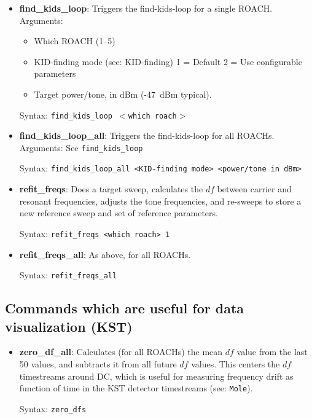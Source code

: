 \begin{itemize}[leftmargin=*,label={}]
\item \textbf{find\_kids\_loop}: Triggers the find-kids-loop for a single ROACH\@.
Arguments:
\begin{itemize}
  \item Which ROACH (1--5)
  \item KID-finding mode (see: KID-finding)
    1 = Default
    2 = Use configurable parameters
  \item Target power/tone, in dBm (-47~dBm typical).
  \end{itemize}

Syntax: \texttt{find\_kids\_loop $<$which roach$>$}

\item \textbf{find\_kids\_loop\_all}: Triggers the find-kids-loop for all ROACHs.
Arguments: See \texttt{find\_kids\_loop}

Syntax: \texttt{find\_kids\_loop\_all <KID-finding mode> <power/tone in dBm>}

\item \textbf{refit\_freqs}: Does a target sweep, calculates the $df$ between carrier and resonant frequencies, adjusts the tone frequencies, and re-sweeps to store a new reference sweep and set of reference parameters.

Syntax: \texttt{refit\_freqs <which roach> 1}

\item \textbf{refit\_freqs\_all}: As above, for all ROACHs.

Syntax: \texttt{refit\_freqs\_all}

\end{itemize}

\subsection{Commands which are useful for data visualization (KST)}

\begin{itemize}[leftmargin=*,label={}]

\item \textbf{zero\_df\_all}: Calculates (for all ROACHs) the mean $df$ value from the last 50 values, and subtracts it from all future $df$ values. This centers the $df$ timestreams around DC, which is useful for measuring frequency drift as function of time in the KST detector timestreams (see: \texttt{Mole}).

Syntax: \texttt{zero\_dfs}

\end{itemize}

